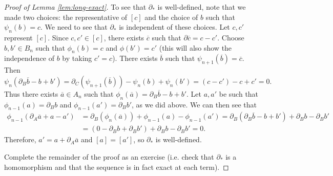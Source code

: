 \begin{proof}[Proof of Lemma \ref{lem:long-exact}]
  To see that $\partial_*$ is well-defined, note
  that we made two choices: the representative
  of $[c]$ and the choice of $b$ such that $\psi_n(b) = c$.
  We need to see that $\partial_*$ is independent
  of these choices.
  Let $c, c'$ represent $[c]$. Since
  $c, c' \in [c]$, there exists $\overline{c}$
  such that $\partial \overline{c} = c - c'$.
  Choose $b, b' \in B_n$ such that $\phi_n(b) = c$
  and $\phi(b') = c'$ (this will also show the
  independence of $b$ by taking $c' = c$).
  There exists $\overline{b}$ such that
  $\psi_{n + 1}(\overline{b}) = \overline{c}$. Then
  \[
    \psi_n(\partial_B \overline{b} - b + b')
    = \partial_C(\psi_{n + 1}(\overline{b})) - \psi_n(b) + \psi_n(b')
    = (c - c') - c + c' = 0.
  \]
  Thus there exists $\overline{a} \in A_n$ such that
  $\phi_n(\overline{a}) = \partial_B \overline{b} - b + b'$.
  Let $a, a'$ be such that
  $\phi_{n - 1}(a) = \partial_B b$ and
  $\phi_{n - 1}(a') = \partial_B b'$, as we did above.
  We can then see that
  \begin{align*}
    \phi_{n - 1}(\partial_A \overline{a} + a - a')
    &= \partial_B (\phi_n(\overline{a})) + \phi_{n - 1}(a) - \phi_{n - 1}(a')
    = \partial_B(\partial_B \overline{b} - b + b')
    + \partial_B b - \partial_B b' \\
    &= (0 -\partial_B b + \partial_B b') + \partial_B b - \partial_B b' = 0.
  \end{align*}
  Therefore, $a' = a + \partial_A \overline{a}$ and
  $[a] = [a']$, so $\partial_*$ is well-defined.

  Complete the remainder of the proof as an exercise
  (i.e. check that $\partial_*$ is a homomorphism and
  that the sequence is in fact exact at each term).
\end{proof}

